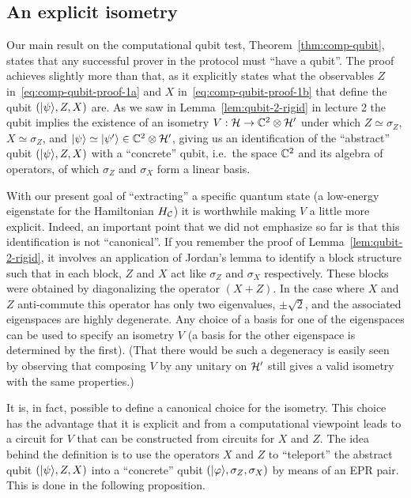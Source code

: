 \subsection{An explicit isometry}
\label{sec:explicit-iso}

Our main result on the computational qubit test, Theorem~\ref{thm:comp-qubit}, states that any successful prover in the protocol must ``have a qubit''. The proof achieves slightly more than that, as it explicitly states what the observables $Z$ in~\eqref{eq:comp-qubit-proof-1a} and $X$ in~\eqref{eq:comp-qubit-proof-1b}  that define the qubit $(|\psi\rangle,Z,X)$ are. As we saw in Lemma~\ref{lem:qubit-2-rigid} in lecture 2 the qubit implies the existence of an isometry $V:\mathcal{H}\to \mathbb{C}^2\otimes \mathcal{H}'$ under which $Z\simeq \sigma_Z$, $X\simeq \sigma_Z$, and $|\psi\rangle\simeq |\psi'\rangle \in \mathbb{C}^2 \otimes \mathcal{H}'$, giving us an identification of the ``abstract'' qubit $(|\psi\rangle,Z,X)$ with a ``concrete'' qubit, i.e.\ the space $\mathbb{C}^2$ and its algebra of operators, of which $\sigma_Z$ and $\sigma_X$ form a linear basis. 

With our present goal of ``extracting'' a specific quantum state (a low-energy eigenstate for the Hamiltonian $H_{\mathcal{C}}$) it is worthwhile making $V$ a little more explicit. Indeed, an important point that we did not emphasize so far is that this identification is not ``canonical''. If you remember the proof of Lemma~\ref{lem:qubit-2-rigid}, it involves an application of Jordan's lemma to identify a block structure such that in each block, $Z$ and $X$ act like $\sigma_Z$ and $\sigma_X$ respectively. These blocks were obtained by diagonalizing the operator $(X+Z)$. In the case where $X$ and $Z$ anti-commute this operator has only two eigenvalues, $\pm\sqrt{2}$, and the associated eigenspaces are highly degenerate. Any choice of a basis for one of the eigenspaces can be used to specify an isometry $V$ (a basis for the other eigenspace is determined by the first). (That there would be such a degeneracy is easily seen by observing that composing $V$ by any unitary on $\mathcal{H}'$ still gives a valid isometry with the same properties.)

It is, in fact, possible to define a canonical choice for the isometry. This choice has the advantage that it is explicit and from a computational viewpoint leads to a circuit for $V$ that can be constructed from circuits for $X$ and $Z$. The idea behind the definition is to use the operators $X$ and $Z$ to ``teleport'' the abstract qubit $(|\psi\rangle,Z,X)$ into a ``concrete'' qubit $(|\varphi\rangle,\sigma_Z,\sigma_X)$ by means of an EPR pair. This is done in the following proposition. 


